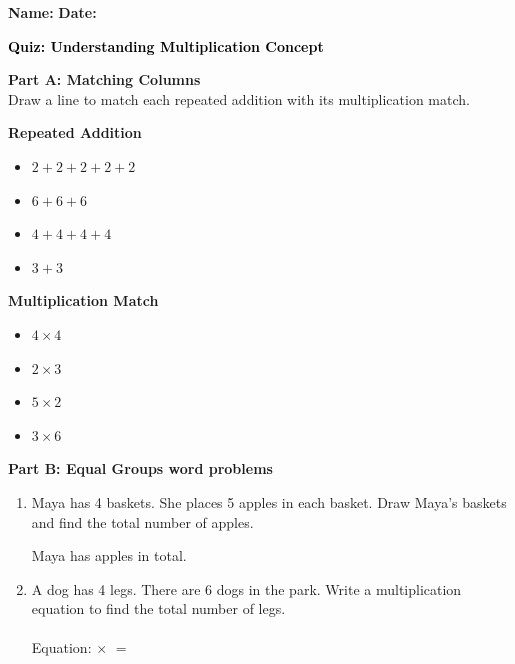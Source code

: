 \documentclass[12pt, letterpaper, fleqn]{article}
\newcommand{\blank}{\underline{\hspace{2.2cm}}}
\begin{document}
\textbf{Name:} \underline{\hspace{5cm}}
\hfill
\textbf{Date:} \underline{\hspace{3cm}}\\

\begin{tcolorbox}[colback=customteal!20]
    \large\textcolor{black}{\textbf{Quiz: Understanding Multiplication Concept}}
\end{tcolorbox}

\vspace{5mm}
\noindent
\textbf{Part A: Matching Columns} \\
Draw a line to match each repeated addition with its multiplication match.

\vspace{5mm}
\begin{minipage}{0.45\textwidth}
\textbf{Repeated Addition}
\begin{itemize}[label=$\bullet$, itemsep=1.2cm]
    \item $2 + 2 + 2 + 2 + 2$
    \item $6 + 6 + 6$
    \item $4 + 4 + 4 + 4$
    \item $3 + 3$
\end{itemize}
\end{minipage}
\begin{minipage}{0.45\textwidth}
\textbf{Multiplication Match}
\begin{itemize}[label=$\bullet$, itemsep=1.2cm]
    \item $4 \times 4$
    \item $2 \times 3$
    \item $5 \times 2$
    \item $3 \times 6$
\end{itemize}
\end{minipage}

\newpage
\begin{tcolorbox}[colback=customteal!10]
\textbf{Part B: Equal Groups word problems}
\end{tcolorbox}

\vspace{5mm}
\begin{enumerate}[itemsep=2.5cm, leftmargin=0.6cm]
\item Maya has 4 baskets. She places 5 apples in each basket. Draw Maya's baskets and find the total number of apples.

\vspace{4cm}
Maya has \blank apples in total.

\item A dog has 4 legs. There are 6 dogs in the park. Write a multiplication equation to find the total number of legs.
\\ \\
Equation: \blank $\times$ \blank $=$ \blank
\end{enumerate}
\end{document}

